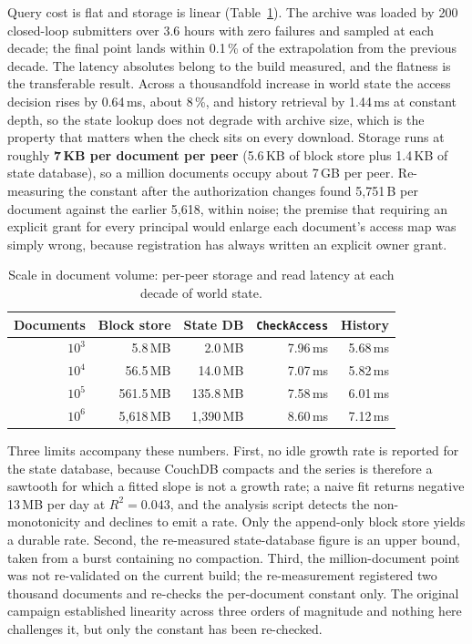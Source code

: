 \documentclass[preprint,12pt]{elsarticle}
\begin{document}
Query cost is flat and storage is linear (Table~\ref{tab:docscale}). The
archive was loaded by 200 closed-loop submitters over 3.6 hours with zero
failures and sampled at each decade; the final point lands within 0.1\,\% of
the extrapolation from the previous decade. The latency absolutes belong to
the build measured, and the flatness is the transferable result. Across a
thousandfold increase in world state the access decision rises by 0.64\,ms,
about 8\,\%, and history retrieval by 1.44\,ms at constant depth, so the
state lookup does not degrade with archive size, which is the property that
matters when the check sits on every download. Storage runs at roughly \textbf{7\,KB per document per
peer} (5.6\,KB of block store plus 1.4\,KB of state database), so a million
documents occupy about 7\,GB per peer. Re-measuring the constant after the
authorization changes found 5{,}751\,B per document against the earlier
5{,}618, within noise; the premise that requiring an explicit grant for every
principal would enlarge each document's access map was simply wrong, because
registration has always written an explicit owner grant.

\begin{table}[!t]
\centering
\caption{Scale in document volume: per-peer storage and read latency at each
decade of world state.}
\label{tab:docscale}
\footnotesize
\setlength{\tabcolsep}{5pt}
\begin{tabular}{@{}rrrrr@{}}
\toprule
Documents & Block store & State DB & \texttt{CheckAccess} & History \\
\midrule
$10^3$ & 5.8\,MB     & 2.0\,MB     & 7.96\,ms & 5.68\,ms \\
$10^4$ & 56.5\,MB    & 14.0\,MB    & 7.07\,ms & 5.82\,ms \\
$10^5$ & 561.5\,MB   & 135.8\,MB   & 7.58\,ms & 6.01\,ms \\
$10^6$ & 5{,}618\,MB & 1{,}390\,MB & 8.60\,ms & 7.12\,ms \\
\bottomrule
\end{tabular}
\end{table}

Three limits accompany these numbers. First, no idle growth rate is reported
for the state database, because CouchDB compacts and the series is therefore a
sawtooth for which a fitted slope is not a growth rate; a naive fit returns
negative 13\,MB per day at $R^2 = 0.043$, and the analysis script detects the
non-monotonicity and declines to emit a rate. Only the append-only block store
yields a durable rate. Second, the re-measured state-database figure is an
upper bound, taken from a burst containing no compaction. Third, the
million-document point was not re-validated on the current build; the
re-measurement registered two thousand documents and re-checks the
per-document constant only. The original campaign established linearity across
three orders of magnitude and nothing here challenges it, but only the
constant has been re-checked.
\end{document}
